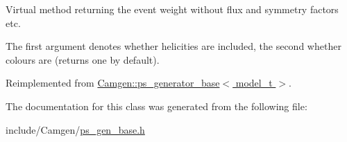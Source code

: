 Virtual method returning the event weight without flux and symmetry factors etc. 

The first argument denotes whether helicities are included, the second whether colours are (returns one by default). 

Reimplemented from \hyperlink{a00451_a258fb687d61e5a0d9d12d5e1d45db8aa}{Camgen\+::ps\+\_\+generator\+\_\+base$<$ model\+\_\+t $>$}.



The documentation for this class was generated from the following file\+:\begin{DoxyCompactItemize}
\item 
include/\+Camgen/\hyperlink{a00743}{ps\+\_\+gen\+\_\+base.\+h}\end{DoxyCompactItemize}
